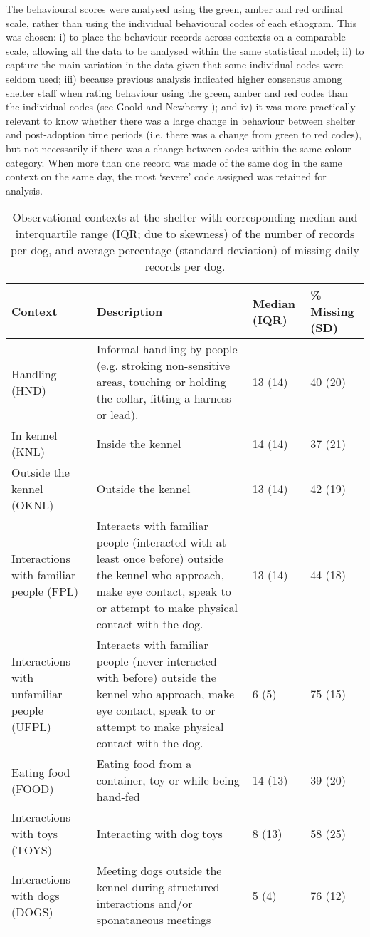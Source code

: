 \documentclass[fleqn,10pt]{wlscirep}
\begin{document}
The behavioural scores were analysed using the green, amber and red ordinal scale, rather than using the individual behavioural codes of each ethogram. This was chosen: i) to place the behaviour records across contexts on a comparable scale, allowing all the data to be analysed within the same statistical model; ii) to capture the main variation in the data given that some individual codes were seldom used; iii) because previous analysis indicated higher consensus among shelter staff when rating behaviour using the green, amber and red codes than the individual codes (see Goold and Newberry \cite{goold2017modelling}); and iv) it was more practically relevant to know whether there was a large change in behaviour between shelter and post-adoption time periods (i.e. there was a change from green to red codes), but not necessarily if there was a change between codes within the same colour category. When more than one record was made of the same dog in the same context on the same day, the most `severe' code assigned was retained for analysis.

\begin{table}[t!]
  \centering
  \small
  \begin{tabular}{p{4cm}p{6cm}p{3cm}p{3cm}}
    \textbf{Context} & \textbf{Description} & \textbf{Median (IQR)} & \textbf{\% Missing (SD)}\\ \hline
    Handling (HND) & \footnotesize{Informal handling by people (e.g. stroking non-sensitive areas, touching or holding the collar, fitting a harness or lead).} & 13 (14) & 40 (20) \\
    In kennel (KNL) & \footnotesize{Inside the kennel} & 14 (14) & 37 (21) \\
    Outside the kennel (OKNL) & \footnotesize{Outside the kennel} & 13 (14) & 42 (19)\\
    Interactions with familiar people (FPL) & \footnotesize{Interacts with familiar people (interacted with at least once before) outside the kennel who approach, make eye contact, speak to or attempt to make physical contact with the dog.} & 13 (14) & 44 (18)\\
    Interactions with unfamiliar people (UFPL) & \footnotesize{Interacts with familiar people (never interacted with before) outside the kennel who approach, make eye contact, speak to or attempt to make physical contact with the dog.} & 6 (5) & 75 (15)\\
    Eating food (FOOD) & \footnotesize{Eating food from a container, toy or while being hand-fed} & 14 (13) & 39 (20)\\
    Interactions with toys (TOYS) & \footnotesize{Interacting with dog toys} & 8 (13) & 58 (25) \\
    Interactions with dogs (DOGS) & \footnotesize{Meeting dogs outside the kennel during structured interactions and/or sponataneous meetings} & 5 (4) & 76 (12) \\
    \hline
  \end{tabular}
  \caption{Observational contexts at the shelter with corresponding median and interquartile range (IQR; due to skewness) of the number of records per dog, and average percentage (standard deviation) of missing daily records per dog.}
  \label{table_contexts}
\end{table}
\end{document}
